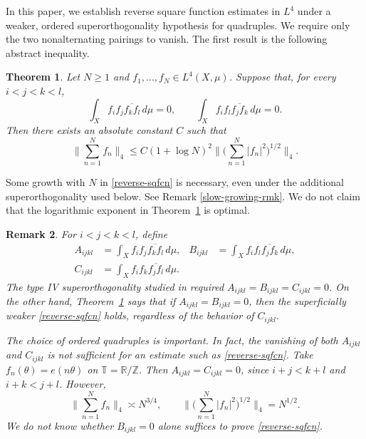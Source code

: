 \documentclass{amsart}
\numberwithin{equation}{section}
\newtheorem{theorem}{Theorem}[section]
\newtheorem{remark}[theorem]{Remark}
\newcommand{\ZR}{\mathbb{R}}
\newcommand{\ZT}{\mathbb{T}}
\newcommand{\ZZ}{\mathbb{Z}}
\begin{document}
In this paper, we establish reverse square function estimates in $L^4$ under a weaker, ordered superorthogonality hypothesis for quadruples. 
We require only the two nonalternating pairings to vanish. 
The first result is the following abstract inequality.

\begin{samepage}
\begin{theorem}
\label{quartic-ortho-thm}
Let $N\geq1$ and $f_1,\ldots,f_N\in L^4(X,\mu)$.
Suppose that, for every $i<j<k<l$,
\begin{equation}
\label{ortho-hypo}
    \int_X f_i f_j\overline{f_k f_l}\,d\mu=0,
    \qquad
    \int_X f_i f_l\overline{f_j f_k}\,d\mu=0.
\end{equation}
Then there exists an absolute constant $C$ such that
\begin{equation}
\label{reverse-sqfcn}
    \Big\|\sum_{n=1}^N f_n\Big\|_4
    \leq C(1+\log N)^2
    \Big\|\Big(\sum_{n=1}^N|f_n|^2\Big)^{1/2}\Big\|_4.
\end{equation}
\end{theorem}
\end{samepage}

Some growth with $N$ in \eqref{reverse-sqfcn} is necessary, even under the additional superorthogonality used below. 
See Remark \ref{slow-growing-rmk}. 
We do not claim that the logarithmic exponent in Theorem~\ref{quartic-ortho-thm} is optimal.

\begin{remark}
\rm
For $i<j<k<l$, define
\begin{align*}
    A_{ijkl}&=\int_X f_i f_j\overline{f_k f_l}\,d\mu,
    &B_{ijkl}&=\int_X f_i f_l\overline{f_j f_k}\,d\mu,\\
    C_{ijkl}&=\int_X f_i f_k\overline{f_j f_l}\,d\mu.
\end{align*}The type IV superorthogonality studied in \cite{GPRY} required $A_{ijkl}=B_{ijkl}=C_{ijkl}=0$. On the other hand, 
Theorem~\ref{quartic-ortho-thm} says that if $A_{ijkl}=B_{ijkl}=0$, then the superficially weaker \eqref{reverse-sqfcn} holds, regardless of the behavior of $C_{ijkl}$.

The choice of ordered quadruples is important.
In fact, the vanishing of both $A_{ijkl}$ and $C_{ijkl}$ is not sufficient for an estimate such as \eqref{reverse-sqfcn}. 
Take $f_n(\theta)=e(n\theta)$ on $\ZT=\ZR/\ZZ$.
Then $A_{ijkl}=C_{ijkl}=0$, since $i+j<k+l$ and $i+k<j+l$.
However,
\[
    \Big\|\sum_{n=1}^N f_n\Big\|_4\asymp N^{3/4},
    \qquad
    \Big\|\Big(\sum_{n=1}^N|f_n|^2\Big)^{1/2}\Big\|_4=N^{1/2}.
\]
We do not know whether $B_{ijkl}=0$ alone suffices to prove
\eqref{reverse-sqfcn}.
\end{remark}
\end{document}
